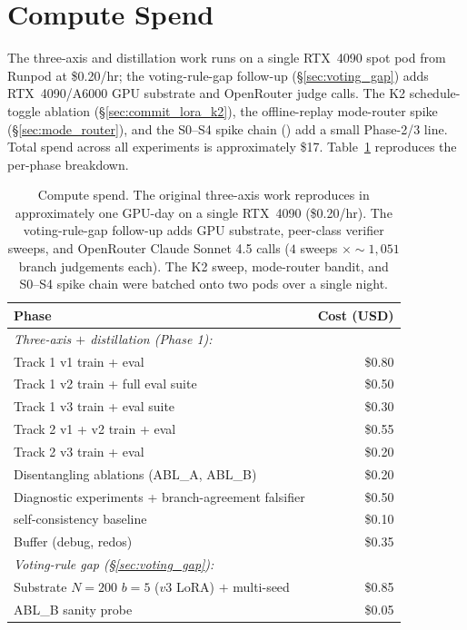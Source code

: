 \section{Compute Spend}
\label{app:compute}

The three-axis and distillation work runs on a single RTX~4090
spot pod from Runpod at \$0.20/hr; the voting-rule-gap follow-up
(\S\ref{sec:voting_gap}) adds RTX~4090/A6000 GPU substrate and
OpenRouter judge calls.  The K2 schedule-toggle ablation
(\S\ref{sec:commit_lora_k2}), the offline-replay mode-router
spike (\S\ref{sec:mode_router}), and the S0--S4 spike chain
() add a small Phase-2/3 line.
Total spend across all experiments is approximately \$17.
Table~\ref{tab:compute} reproduces the per-phase breakdown.

\begin{table}[h]
\centering
\caption{Compute spend.  The original three-axis work reproduces
in approximately one GPU-day on a single RTX~4090 (\$0.20/hr).
The voting-rule-gap follow-up adds GPU substrate, peer-class
verifier sweeps, and OpenRouter Claude Sonnet 4.5 calls
($4$ sweeps $\times \sim 1{,}051$ branch judgements each).
The K2 sweep, mode-router bandit, and S0--S4 spike chain were
batched onto two pods over a single night.}
\label{tab:compute}
\smallskip
\begin{tabular}{lr}
\toprule
Phase & Cost (USD) \\
\midrule
\multicolumn{2}{l}{\emph{Three-axis $+$ distillation (Phase 1):}} \\
Track 1 v1 train + eval & \$0.80 \\
Track 1 v2 train + full eval suite & \$0.50 \\
Track 1 v3 train + eval suite & \$0.30 \\
Track 2 v1 + v2 train + eval & \$0.55 \\
Track 2 v3 train + eval & \$0.20 \\
Disentangling ablations (ABL\_A, ABL\_B) & \$0.20 \\
Diagnostic experiments + branch-agreement falsifier & \$0.50 \\
\Qwen{} self-consistency baseline & \$0.10 \\
Buffer (debug, redos) & \$0.35 \\
\midrule
\multicolumn{2}{l}{\emph{Voting-rule gap (\S\ref{sec:voting_gap}):}} \\
Substrate $N{=}200$ \cmaj{} $b{=}5$ ($v3$ LoRA) $+$ multi-seed \cmajc{} & \$0.85 \\
ABL\_B sanity probe & \$0.05 \\

\end{tabular}
\end{table}

